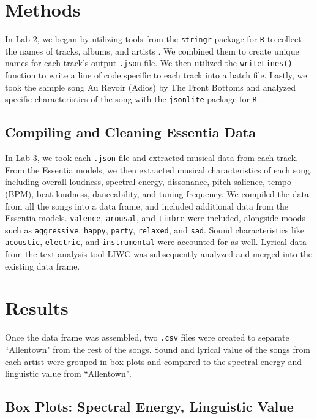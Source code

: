 \documentclass{article}\usepackage[]{graphicx}\usepackage[]{xcolor}
\begin{document}
\begin{multicols}{2}
\section{Methods}

In Lab 2, we began by utilizing tools from the \texttt{stringr} package for \texttt{R} to collect the names of tracks, albums, and artists \citep{str}. We combined them to create unique names for each track's output \texttt{.json} file. We then utilized the \texttt{writeLines()} function to write a line of code specific to each track into a batch file. Lastly, we took the sample song Au Revoir (Adios) by The Front Bottoms and analyzed specific characteristics of the song with the \texttt{jsonlite} package for \texttt{R} \citep{jsl}.

\subsection{Compiling and Cleaning Essentia Data}

In Lab 3, we took each \texttt{.json} file and extracted musical data from each track. From the Essentia models, we then extracted musical characteristics of each song, including overall loudness, spectral energy, dissonance, pitch salience, tempo (BPM), beat loudness, danceability, and tuning frequency. We compiled the data from all the songs into a data frame, and included additional data from the Essentia models. \texttt{valence}, \texttt{arousal}, and \texttt{timbre} were included, alongside moods such as \texttt{aggressive}, \texttt{happy}, \texttt{party}, \texttt{relaxed}, and \texttt{sad}. Sound characteristics like \texttt{acoustic}, \texttt{electric}, and \texttt{instrumental} were accounted for as well. Lyrical data from the text analysis tool LIWC was subsequently analyzed and merged into the existing data frame. 

\section{Results}

Once the data frame was assembled, two \texttt{.csv} files were created to separate ``Allentown" from the rest of the songs. Sound and lyrical value of the songs from each artist were grouped in box plots and compared to the spectral energy and linguistic value from ``Allentown".

\subsection{Box Plots: Spectral Energy, Linguistic Value}


\end{multicols}
\end{document}
